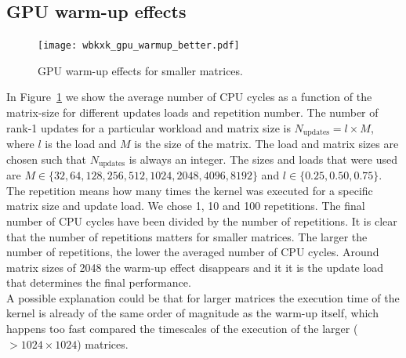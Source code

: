 \documentclass[11pt]{article}
\numberwithin{figure}{section}
\numberwithin{table}{section}
\begin{document}
    \subsection{GPU warm-up effects}
      \begin{figure}
        \centering
        \texttt{[image: wbkxk\_gpu\_warmup\_better.pdf]}
        \caption{GPU warm-up effects for smaller matrices.}
        \label{fig:gpu-warmup}
      \end{figure}
     In Figure~\ref{fig:gpu-warmup} we show the average number of CPU cycles as a function of the matrix-size for different updates loads and repetition number. The number of rank-1 updates for a particular workload and matrix size is $N_\text{updates}=l\times M$, where $l$ is the load and $M$ is the size of the matrix. The load and matrix sizes are chosen such that $N_\text{updates}$ is always an integer. The sizes and loads that were used are $M\in\{32,64,128,256,512,1024,2048,4096,8192\}$ and $l\in\{0.25,0.50,0.75\}$. The repetition means how many times the kernel was executed for a specific matrix size and update load. We chose 1, 10 and 100 repetitions. The final number of CPU cycles have been divided by the number of repetitions.
     It is clear that the number of repetitions matters for smaller matrices. The larger the number of repetitions, the lower the averaged number of CPU cycles. Around matrix sizes of 2048 the warm-up effect disappears and it it is the update load that determines the final performance.\\
     
     A possible explanation could be that for larger matrices the execution time of the kernel is already of the same order of magnitude as the warm-up itself, which happens too fast compared the timescales of the execution of the larger ($>1024\times1024$) matrices. 
\end{document}
